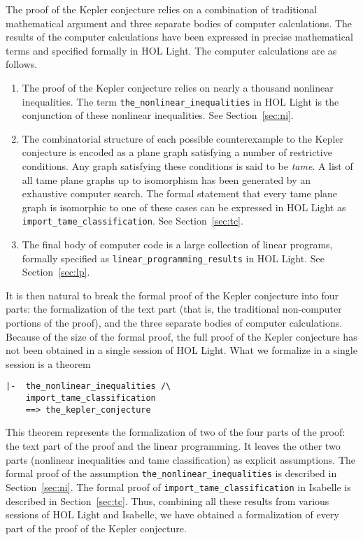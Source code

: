 The proof of the Kepler conjecture relies on a combination of
traditional mathematical argument and three separate bodies of
computer calculations.  The results of the computer calculations have
been expressed in precise mathematical terms and specified formally in
HOL Light.  The computer calculations are as follows.
\begin{enumerate}
\item The proof of the Kepler conjecture relies on nearly a thousand
  nonlinear inequalities.  
  The term \verb!the_nonlinear_inequalities! in HOL Light is the
  conjunction of these nonlinear inequalities.  See
  Section~\ref{sec:ni}.
\item The combinatorial structure of each possible counterexample to
  the Kepler conjecture is encoded as a plane graph satisfying a
  number of restrictive conditions.  Any graph satisfying these
  conditions is said to be {\it tame}.  A list of all tame plane graphs up
  to isomorphism has been generated by an exhaustive computer search.
  The formal statement that every tame plane graph is isomorphic to one of
  these cases can be expressed in HOL Light as
  \verb!import_tame_classification!.  See Section~\ref{sec:tc}.
\item The final body of computer code is a large collection of linear
  programs,  formally specified as
  \verb!linear_programming_results! in HOL Light.  See Section~\ref{sec:lp}.
\end{enumerate}

It is then natural to break the formal proof of the Kepler conjecture
into four parts: the formalization of the text part (that is, the
traditional non-computer portions of the proof), and the three
separate bodies of computer calculations.  Because of the size of the
formal proof, the full proof of the Kepler conjecture has not been
obtained in a single session of HOL Light.  What we formalize in a
single session is a theorem

\begin{obeylines}

\begin{Verbatim}[fontsize=\small]
|-  the_nonlinear_inequalities /\
    import_tame_classification
    ==> the_kepler_conjecture
\end{Verbatim}

\end{obeylines}

This theorem represents the formalization of two of the four parts of
the proof: the text part of the proof and the linear programming.  It
leaves the other two parts (nonlinear inequalities and tame
classification) as explicit assumptions.  The formal proof of the assumption
\verb!the_nonlinear_inequalities! is described in
Section~\ref{sec:ni}.  The formal proof of
\verb!import_tame_classification! in Isabelle is described in
Section~\ref{sec:tc}.  Thus, combining all these results from various
sessions of HOL Light and Isabelle, we have obtained a formalization
of every part of the proof of the Kepler conjecture.


